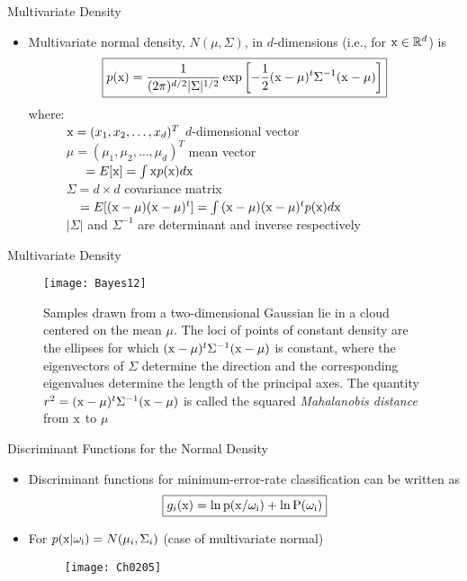 \begin{frame}{Multivariate Density}
\begin{itemize}
\item Multivariate normal density, $N(\mu,\Sigma)$, in $d$-dimensions (i.e., for ${\rm x}\in \mathbb{R}^d$) is
\[\boxed{p({\rm x})=\frac{1}{(2\pi)^{d/2}|\Sigma|^{1/2}}\exp\left[-\frac{1}{2}({\rm x}-\mu)^t\Sigma^{-1}({\rm x}-\mu)\right]}\]
where:\\
~~~~~~${\rm x}=(x_1,x_2,\ldots,x_d)^T$ $d$-dimensional vector\\
~~~~~~$\mu = (\mu_1,\mu_2,\ldots,\mu_d)^T$ mean vector\\
~~~~~~~~~$= E[{\rm x}]=\int {\rm x}p({\rm x})d{\rm x} $\\
~~~~~~$\Sigma=d\times d$ covariance matrix\\
~~~~~~~~$= E[({\rm x}-\mu)({\rm x}-\mu)^t]=\int {({\rm x}-\mu)({\rm x}-\mu)^t}p({\rm x})d{\rm x} $\\
~~~~~~$|\Sigma|$ and $\Sigma^{-1}$ are determinant and inverse respectively\\


\end{itemize}
\end{frame}

\begin{frame}{Multivariate Density}
\begin{figure}
\texttt{[image: Bayes12]}
\caption{Samples drawn from a two-dimensional Gaussian lie in a cloud centered on the mean $\mu$. The loci of points of constant density are the ellipses for which $({\rm x -\mu})^t\Sigma^{-1}({\rm x -\mu})$ is constant, where the eigenvectors of
$\Sigma$ determine the direction and the corresponding eigenvalues determine the
length of the principal axes. The quantity $r^2=({\rm x -\mu})^t\Sigma^{-1}({\rm x -\mu})$ is called
the squared \textit{\color{mycolor2}Mahalanobis distance} from ${\rm x}$ to $\mu$}
\end{figure}
\end{frame}

\begin{frame}{Discriminant Functions for the Normal Density}
\begin{itemize}
\item Discriminant functions for minimum-error-rate classification can be written as
\[\boxed{g_i(\rm x)=\ln p({\rm x}/\omega_i)+\ln P(\omega_i)}\]
\item For $p({\rm x|\omega_i})=N(\mu_i,\Sigma_i)$ (case of multivariate normal)
\begin{figure}
\texttt{[image: Ch0205]}
\end{figure}
\end{itemize}
\end{frame}

